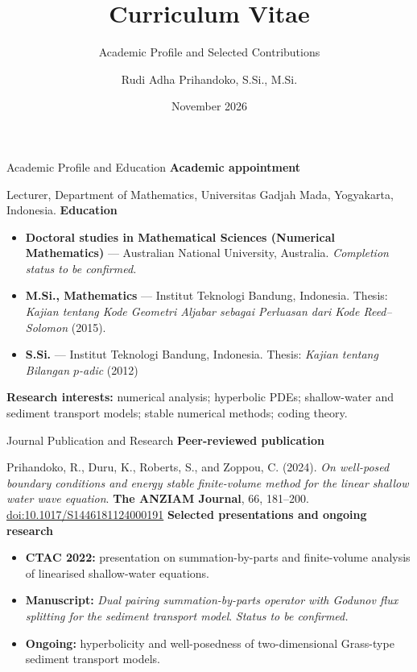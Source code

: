 \documentclass[aspectratio=169,11pt]{beamer}
\title{Curriculum Vitae}
\subtitle{Academic Profile and Selected Contributions}
\author{Rudi Adha Prihandoko, S.Si., M.Si.}
\institute{Department of Mathematics\\Faculty of Mathematics and Natural Sciences\\Universitas Gadjah Mada}
\date{November 2026}
\begin{document}
\begin{frame}[plain]\titlepage\end{frame}

\begin{frame}{Academic Profile and Education}
\small
\textbf{Academic appointment}\par
Lecturer, Department of Mathematics, Universitas Gadjah Mada, Yogyakarta, Indonesia.
\vspace{0.65em}
\textbf{Education}
\begin{itemize}
\item \textbf{Doctoral studies in Mathematical Sciences (Numerical Mathematics)} --- Australian National University, Australia. \emph{Completion status to be confirmed.}
\item \textbf{M.Si., Mathematics} --- Institut Teknologi Bandung, Indonesia. Thesis: \emph{Kajian tentang Kode Geometri Aljabar sebagai Perluasan dari Kode Reed--Solomon} (2015).
\item \textbf{S.Si.} --- Institut Teknologi Bandung, Indonesia. Thesis: \emph{Kajian tentang Bilangan $p$-adic} (2012)
\end{itemize}
\textbf{Research interests:} numerical analysis; hyperbolic PDEs; shallow-water and sediment transport models; stable numerical methods; coding theory.
\end{frame}

\begin{frame}{Journal Publication and Research}
\small
\textbf{Peer-reviewed publication}\par
Prihandoko, R., Duru, K., Roberts, S., and Zoppou, C. (2024). \emph{On well-posed boundary conditions and energy stable finite-volume method for the linear shallow water wave equation}. \textbf{The ANZIAM Journal}, 66, 181--200.\\
\href{https://doi.org/10.1017/S1446181124000191}{doi:10.1017/S1446181124000191}
\vspace{0.7em}
\textbf{Selected presentations and ongoing research}
\begin{itemize}
\item \textbf{CTAC 2022:} presentation on summation-by-parts and finite-volume analysis of linearised shallow-water equations.
\item \textbf{Manuscript:} \emph{Dual pairing summation-by-parts operator with Godunov flux splitting for the sediment transport model}. \emph{Status to be confirmed.}
\item \textbf{Ongoing:} hyperbolicity and well-posedness of two-dimensional Grass-type sediment transport models.
\end{itemize}
\end{frame}
\end{document}
